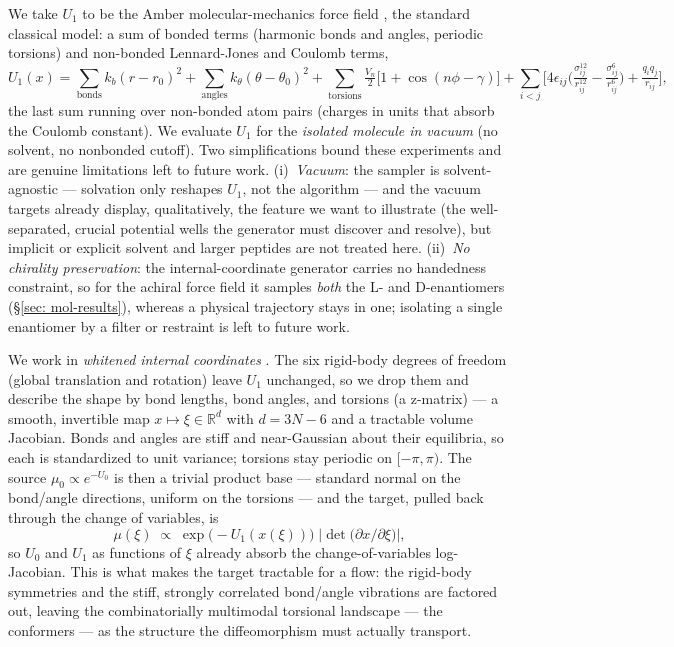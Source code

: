 \documentclass[11pt]{article}
\begin{document}
We take $U_1$ to be the Amber molecular-mechanics force field \citep{cornell1995amber}, the standard classical
model: a sum of bonded terms (harmonic bonds and angles, periodic torsions) and non-bonded Lennard-Jones and
Coulomb terms,
\begin{equation}
    U_1(x) = \!\!\sum_{\text{bonds}}\!\! k_b (r-r_0)^2 + \!\!\sum_{\text{angles}}\!\! k_\theta (\theta-\theta_0)^2
    + \!\!\sum_{\text{torsions}}\!\! \tfrac{V_n}{2}\big[1+\cos(n\phi-\gamma)\big]
    + \sum_{i<j}\!\Big[ 4\epsilon_{ij}\Big(\tfrac{\sigma_{ij}^{12}}{r_{ij}^{12}} - \tfrac{\sigma_{ij}^{6}}{r_{ij}^{6}}\Big) + \tfrac{q_i q_j}{r_{ij}} \Big],
    \label{eq: amber}
\end{equation}
the last sum running over non-bonded atom pairs (charges in units that absorb the Coulomb constant). We
evaluate $U_1$ for the \emph{isolated molecule in vacuum} (no solvent, no nonbonded cutoff). Two simplifications
bound these experiments and are genuine limitations left to future work. (i)~\emph{Vacuum}: the sampler is
solvent-agnostic --- solvation only reshapes $U_1$, not the algorithm --- and the vacuum targets already
display, qualitatively, the feature we want to illustrate (the well-separated, crucial potential wells the
generator must discover and resolve), but implicit or explicit solvent and larger peptides are not treated
here. (ii)~\emph{No chirality preservation}: the internal-coordinate generator carries no handedness
constraint, so for the achiral force field it samples \emph{both} the L- and D-enantiomers
(\S\ref{sec: mol-results}), whereas a physical trajectory stays in one; isolating a single enantiomer by a
filter or restraint is left to future work.

We work in \emph{whitened internal coordinates} \citep{noe2019boltzmann}. The six rigid-body degrees of
freedom (global translation and rotation) leave $U_1$ unchanged, so we drop them and describe the shape by
bond lengths, bond angles, and torsions (a z-matrix) --- a smooth, invertible map $x \mapsto \xi \in
\mathbb R^{d}$ with $d = 3N - 6$ and a tractable volume Jacobian. Bonds and angles are stiff and near-Gaussian
about their equilibria, so each is standardized to unit variance; torsions stay periodic on $[-\pi,\pi)$. The
source $\mu_0 \propto e^{-U_0}$ is then a trivial product base --- standard normal on the bond/angle
directions, uniform on the torsions --- and the target, pulled back through the change of variables, is
\begin{equation}
    \mu(\xi) \;\propto\; \exp\!\big(\!-U_1(x(\xi))\big)\;\big|\det\big(\partial x/\partial \xi\big)\big|,
    \label{eq: whiten}
\end{equation}
so $U_0$ and $U_1$ as functions of $\xi$ already absorb the change-of-variables log-Jacobian. This is what
makes the target tractable for a flow: the rigid-body symmetries and the stiff, strongly correlated
bond/angle vibrations are factored out, leaving the combinatorially multimodal torsional landscape --- the
conformers --- as the structure the diffeomorphism must actually transport.
\end{document}
